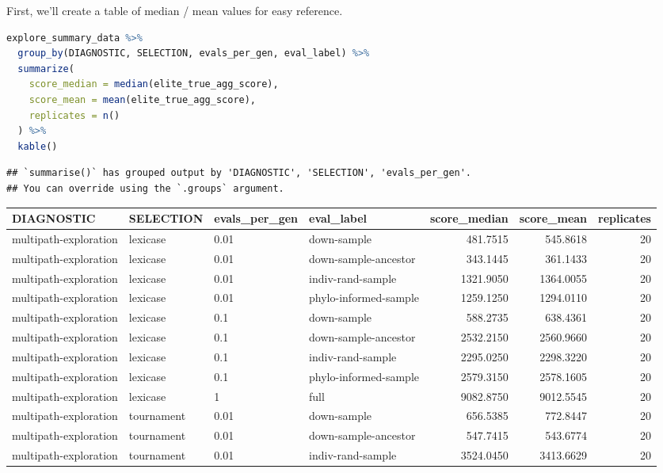\documentclass[
]{book}
\begin{document}
First, we'll create a table of median / mean values for easy reference.

\begin{lstlisting}[language=R]
explore_summary_data %>%
  group_by(DIAGNOSTIC, SELECTION, evals_per_gen, eval_label) %>%
  summarize(
    score_median = median(elite_true_agg_score),
    score_mean = mean(elite_true_agg_score),
    replicates = n()
  ) %>%
  kable()
\end{lstlisting}

\begin{lstlisting}
## `summarise()` has grouped output by 'DIAGNOSTIC', 'SELECTION', 'evals_per_gen'.
## You can override using the `.groups` argument.
\end{lstlisting}

\begin{tabular}{l|l|l|l|r|r|r}
\hline
DIAGNOSTIC & SELECTION & evals\_per\_gen & eval\_label & score\_median & score\_mean & replicates\\
\hline
multipath-exploration & lexicase & 0.01 & down-sample & 481.7515 & 545.8618 & 20\\
\hline
multipath-exploration & lexicase & 0.01 & down-sample-ancestor & 343.1445 & 361.1433 & 20\\
\hline
multipath-exploration & lexicase & 0.01 & indiv-rand-sample & 1321.9050 & 1364.0055 & 20\\
\hline
multipath-exploration & lexicase & 0.01 & phylo-informed-sample & 1259.1250 & 1294.0110 & 20\\
\hline
multipath-exploration & lexicase & 0.1 & down-sample & 588.2735 & 638.4361 & 20\\
\hline
multipath-exploration & lexicase & 0.1 & down-sample-ancestor & 2532.2150 & 2560.9660 & 20\\
\hline
multipath-exploration & lexicase & 0.1 & indiv-rand-sample & 2295.0250 & 2298.3220 & 20\\
\hline
multipath-exploration & lexicase & 0.1 & phylo-informed-sample & 2579.3150 & 2578.1605 & 20\\
\hline
multipath-exploration & lexicase & 1 & full & 9082.8750 & 9012.5545 & 20\\
\hline
multipath-exploration & tournament & 0.01 & down-sample & 656.5385 & 772.8447 & 20\\
\hline
multipath-exploration & tournament & 0.01 & down-sample-ancestor & 547.7415 & 543.6774 & 20\\
\hline
multipath-exploration & tournament & 0.01 & indiv-rand-sample & 3524.0450 & 3413.6629 & 20\\

\end{tabular}
\end{document}
